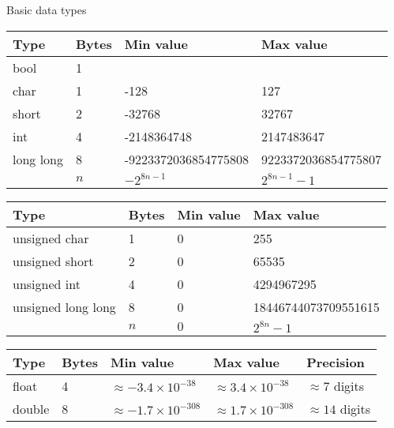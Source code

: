 \documentclass[12pt,t]{beamer}
\begin{document}
\begin{frame}{Basic data types}

    {\scriptsize
        \begin{center}
            \begin{tabular}{l|lll}
                Type & Bytes & Min value & Max value \\
                \hline
                bool & 1 & & \\
                char & 1 & -128 & 127 \\
                short & 2 & -32768 & 32767 \\
                int & 4 & -2148364748 & 2147483647 \\
                long long & 8 & -9223372036854775808 & 9223372036854775807 \\
                          & $n$ & $-2^{8n-1}$ & $2^{8n-1}-1$
            \end{tabular}
        \end{center}
    }

    {\scriptsize
        \begin{center}
            \begin{tabular}{l|lll}
                Type & Bytes & Min value & Max value \\
                \hline
                unsigned char & 1 & 0 & 255 \\
                unsigned short & 2 & 0 & 65535 \\
                unsigned int & 4 & 0 & 4294967295 \\
                unsigned long long & 8 & 0 & 18446744073709551615 \\
                    & $n$ & $0$ & $2^{8n}-1$
            \end{tabular}
        \end{center}
    }

    {\scriptsize
        \begin{center}
            \begin{tabular}{l|llll}
                Type & Bytes & Min value & Max value & Precision \\
                \hline
                float & 4 & $\approx -3.4\times 10^{-38}$ & $\approx 3.4\times 10^{-38}$ & $\approx 7$ digits \\
                double & 8 & $\approx -1.7\times 10^{-308}$ & $\approx 1.7\times 10^{-308}$ & $\approx 14$ digits \\
            \end{tabular}
        \end{center}
    }

\end{frame}
\end{document}

